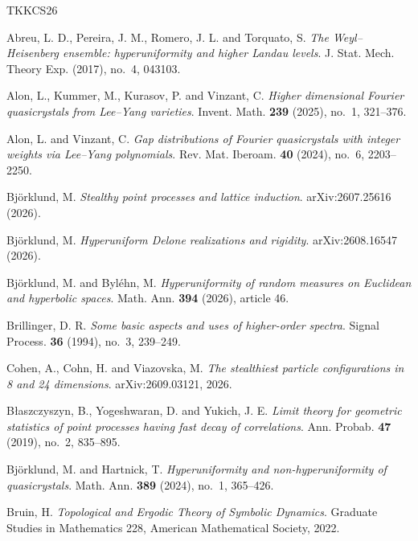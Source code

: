 \documentclass[11pt,reqno,a4paper]{amsart}
\numberwithin{equation}{section}
\theoremstyle{compact}
\theoremstyle{definition}
\theoremstyle{definition}
\begin{document}

\begin{thebibliography}{TKKCS26}

Abreu, L. D., Pereira, J. M., Romero, J. L. and Torquato, S.
\newblock \emph{The Weyl--Heisenberg ensemble: hyperuniformity and higher Landau levels}.
\newblock J. Stat. Mech. Theory Exp. (2017), no.~4, 043103.

Alon, L., Kummer, M., Kurasov, P. and Vinzant, C.
\newblock \emph{Higher dimensional Fourier quasicrystals from Lee--Yang varieties}.
\newblock Invent. Math. \textbf{239} (2025), no.~1, 321--376.

Alon, L. and Vinzant, C.
\newblock \emph{Gap distributions of Fourier quasicrystals with integer weights via Lee--Yang polynomials}.
\newblock Rev. Mat. Iberoam. \textbf{40} (2024), no.~6, 2203--2250.

Bj\"orklund, M.
\newblock \emph{Stealthy point processes and lattice induction}.
\newblock arXiv:2607.25616 (2026).

Bj\"orklund, M.
\newblock \emph{Hyperuniform Delone realizations and rigidity}.
\newblock arXiv:2608.16547 (2026).

Bj\"orklund, M. and Byl\'ehn, M.
\newblock \emph{Hyperuniformity of random measures on Euclidean and hyperbolic spaces}.
\newblock Math. Ann. \textbf{394} (2026), article 46.

Brillinger, D. R.
\newblock \emph{Some basic aspects and uses of higher-order spectra}.
\newblock Signal Process. \textbf{36} (1994), no.~3, 239--249.

Cohen, A., Cohn, H. and Viazovska, M.
\newblock \emph{The stealthiest particle configurations in 8 and 24 dimensions}.
\newblock arXiv:2609.03121, 2026.

B\l{}aszczyszyn, B., Yogeshwaran, D. and Yukich, J. E.
\newblock \emph{Limit theory for geometric statistics of point processes having fast decay of correlations}.
\newblock Ann. Probab. \textbf{47} (2019), no.~2, 835--895.

Bj\"orklund, M. and Hartnick, T.
\newblock \emph{Hyperuniformity and non-hyperuniformity of quasicrystals}.
\newblock Math. Ann. \textbf{389} (2024), no.~1, 365--426.

Bruin, H.
\newblock \emph{Topological and Ergodic Theory of Symbolic Dynamics}.
\newblock Graduate Studies in Mathematics 228, American Mathematical Society, 2022.


\end{thebibliography}
\end{document}
